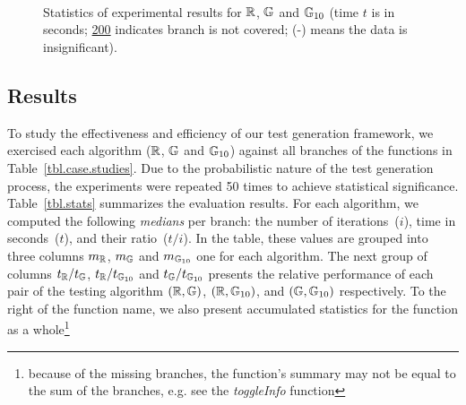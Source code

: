 \begin{figure*}[!t]
\centering
\begin{minipage}[c]{.43\linewidth}
\centering
{}\\
\\
\\
\begin{minipage}[c]{.6\linewidth}
\subfloat[Time $t$]{
  \centering
  
  \label{fig.gen.time.comp}
}
\end{minipage}
\hfill
\begin{minipage}[c]{.3\linewidth}
\subfloat[Speed $t/i$]{
  \centering
  
  \label{fig.get.cost}
}
\end{minipage}
\end{minipage}
\hfill
\begin{minipage}[c]{.55\linewidth}
\end{minipage}
\caption{Statistics of experimental results for $\mathbb{R}$, $\mathbb{G}$ and $\mathbb{G}_{10}$ (time $t$ is in seconds; \underline{200} indicates branch is not covered; (-) means the data is insignificant).}
\label{lab3}
\end{figure*}


\subsection{Results}
\label{sub.sec.eval.results}

To study the effectiveness and efficiency of our test generation framework, we exercised each algorithm ($\mathbb{R}$, $\mathbb{G}$ and $\mathbb{G}_{10}$) against all branches of the functions in Table~\ref{tbl.case.studies}. Due to the probabilistic nature of the test generation process, the experiments were repeated 50 times to achieve statistical significance. Table~\ref{tbl.stats} summarizes the evaluation results. For each algorithm, we computed the following \emph{medians} per branch: the number of iterations~($i$), time in seconds~($t$), and their ratio~($t/i$). In the table, these values are grouped into three columns $m_{\mathbb{R}}$, $m_{\mathbb{G}}$ and $m_{\mathbb{G}_{10}}$ one for each algorithm. The next group of columns $t_{\mathbb{R}}/t_{\mathbb{G}}$, $t_{\mathbb{R}}/t_{\mathbb{G}_{10}}$ and $t_{\mathbb{G}}/t_{\mathbb{G}_{10}}$ presents the relative performance of each pair of the testing algorithm $(\mathbb{R},\mathbb{G})$, $(\mathbb{R},\mathbb{G}_{10})$, and $(\mathbb{G},\mathbb{G}_{10})$ respectively. To the right of the function name, we also present accumulated statistics for the function as a whole\footnote{because of the missing branches, the function's summary may not be equal to the sum of the branches, e.g. see the \emph{toggleInfo} function}

